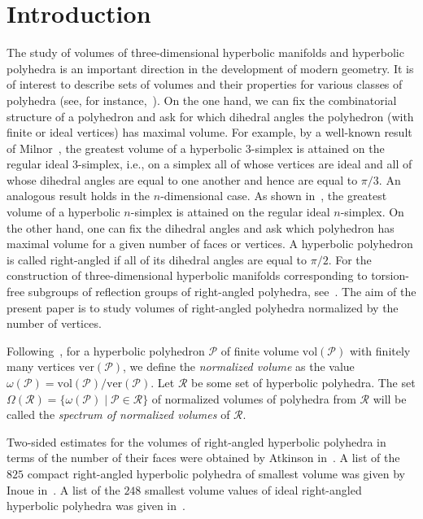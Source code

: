 \documentclass{amsart}
\newcommand{\vol}{\mathrm{vol}}
\newcommand{\ver}{\mathrm{ver}}
\begin{document}
\maketitle 
	
\section{Introduction} \label{sec1}
	
The study of volumes of three-dimensional hyperbolic manifolds and hyperbolic polyhedra is an important direction in the development of modern geometry. It is of interest to describe sets of volumes and their properties for various classes of polyhedra (see, for instance,~\cite{Bel21, CGV}). On the one hand, we can fix the combinatorial structure of a polyhedron and ask for which dihedral angles the polyhedron (with finite or ideal vertices) has maximal volume. For example, by a well-known result of Milnor~\cite{Mil82}, the greatest volume of a hyperbolic $3$-simplex is attained on the regular ideal $3$-simplex, i.e., on a simplex all of whose vertices are ideal and all of whose dihedral angles are equal to one another and hence are equal to $\pi/3$. An analogous result holds in the $n$-dimensional case. As shown in~\cite{HaMu81}, the greatest volume of a hyperbolic $n$-simplex is attained on the regular ideal $n$-simplex. On the other hand, one can fix the dihedral angles and ask which polyhedron has maximal volume for a given number of faces or vertices. A hyperbolic polyhedron is called right-angled if all of its dihedral angles are equal to $\pi/2$. For the construction of three-dimensional hyperbolic manifolds corresponding to torsion-free subgroups of reflection groups of right-angled polyhedra, see~\cite{Ves17}. The aim of the present paper is to study volumes of right-angled polyhedra normalized by the number of vertices.

Following~\cite{Ves10}, for a hyperbolic polyhedron $\mathcal P$ of finite volume $\vol(\mathcal P)$ with finitely many vertices $\ver(\mathcal P)$, we define the \textit{normalized volume} as the value $\omega(\mathcal P) = \vol(\mathcal P) / \ver(\mathcal P)$. Let $\mathcal R$ be some set of hyperbolic polyhedra. The set $\Omega (\mathcal R) = \{ \omega(\mathcal P) \mid \mathcal P \in \mathcal R \}$ of normalized volumes of polyhedra from $\mathcal R$ will be called the \textit{spectrum of normalized volumes} of $\mathcal R$.

Two-sided estimates for the volumes of right-angled hyperbolic polyhedra in terms of the number of their faces were obtained by Atkinson in~\cite{At09}. A list of the $825$ compact right-angled hyperbolic polyhedra of smallest volume was given by Inoue in~\cite{In22}. A list of the $248$ smallest volume values of ideal right-angled hyperbolic polyhedra was given in~\cite{VeEg}.
\end{document}
